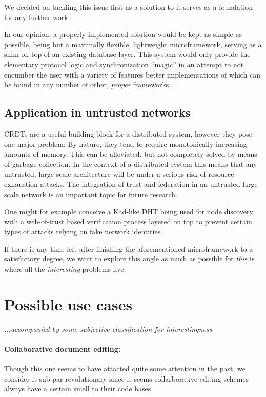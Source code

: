 \documentclass[12pt,a4paper,notitlepage]{article}
\begin{document}
We decided on tackling this issue first as a solution to it serves as a foundation for any further work.

In our opinion, a properly implemented solution would be kept as simple as possible, being but a maximally flexible,
lightweight microframework, serving as a shim on top of an existing database layer. This system would only provide the
elementary protocol logic and synchronization ``magic'' in an attempt to not encumber the user with a variety of
features better implementations of which can be found in any number of other, \emph{proper} frameworks.

\subsection{Application in untrusted networks}
CRDTs are a useful building block for a distributed system, however they pose one major problem: By nature, they tend to
require monotonically increasing amounts of memory. This can be alleviated, but not completely solved by means of
garbage collection. In the context of a distributed system this means that any untrusted, large-scale architecture will
be under a serious risk of resource exhaustion attacks. The integration of trust and federation in an untrusted
large-scale network is an important topic for future research.

One might for example conceive a Kad-like DHT being used for node discovery with a web-of-trust based verification
process layered on top to prevent certain types of attacks relying on fake network identities.

If there is any time left after finishing the aforementioned microframework to a satisfactory degree, we want to explore
this angle as much as possible for \emph{this} is where all the \emph{interesting} problems live.

\section{Possible use cases}

\emph{...accompanied by some subjective classification for interestingness}

\paragraph{Collaborative document editing:} Though this one seems to have attacted quite some attention in the past, we
consider it sub-par revolutionary since it seems collarborative editing schemes always have a certain smell to their
code bases.
\end{document}
